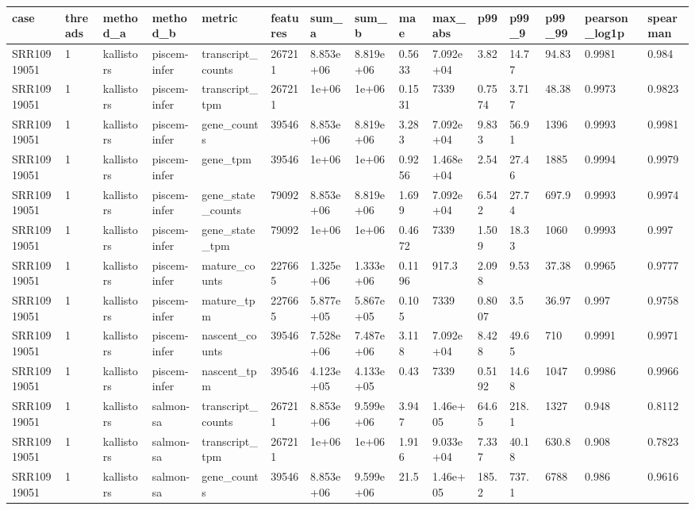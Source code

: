 \begin{tabular}{lllllllllllllll}
\toprule
case & threads & method\_a & method\_b & metric & features & sum\_a & sum\_b & mae & max\_abs & p99 & p99\_9 & p99\_99 & pearson\_log1p & spearman \\
\midrule
SRR10919051 & 1 & kallistors & piscem-infer & transcript\_counts & 267211 & 8.853e+06 & 8.819e+06 & 0.5633 & 7.092e+04 & 3.82 & 14.77 & 94.83 & 0.9981 & 0.984 \\
SRR10919051 & 1 & kallistors & piscem-infer & transcript\_tpm & 267211 & 1e+06 & 1e+06 & 0.1531 & 7339 & 0.7574 & 3.717 & 48.38 & 0.9973 & 0.9823 \\
SRR10919051 & 1 & kallistors & piscem-infer & gene\_counts & 39546 & 8.853e+06 & 8.819e+06 & 3.283 & 7.092e+04 & 9.833 & 56.91 & 1396 & 0.9993 & 0.9981 \\
SRR10919051 & 1 & kallistors & piscem-infer & gene\_tpm & 39546 & 1e+06 & 1e+06 & 0.9256 & 1.468e+04 & 2.54 & 27.46 & 1885 & 0.9994 & 0.9979 \\
SRR10919051 & 1 & kallistors & piscem-infer & gene\_state\_counts & 79092 & 8.853e+06 & 8.819e+06 & 1.699 & 7.092e+04 & 6.542 & 27.74 & 697.9 & 0.9993 & 0.9974 \\
SRR10919051 & 1 & kallistors & piscem-infer & gene\_state\_tpm & 79092 & 1e+06 & 1e+06 & 0.4672 & 7339 & 1.509 & 18.33 & 1060 & 0.9993 & 0.997 \\
SRR10919051 & 1 & kallistors & piscem-infer & mature\_counts & 227665 & 1.325e+06 & 1.333e+06 & 0.1196 & 917.3 & 2.098 & 9.53 & 37.38 & 0.9965 & 0.9777 \\
SRR10919051 & 1 & kallistors & piscem-infer & mature\_tpm & 227665 & 5.877e+05 & 5.867e+05 & 0.105 & 7339 & 0.8007 & 3.5 & 36.97 & 0.997 & 0.9758 \\
SRR10919051 & 1 & kallistors & piscem-infer & nascent\_counts & 39546 & 7.528e+06 & 7.487e+06 & 3.118 & 7.092e+04 & 8.428 & 49.65 & 710 & 0.9991 & 0.9971 \\
SRR10919051 & 1 & kallistors & piscem-infer & nascent\_tpm & 39546 & 4.123e+05 & 4.133e+05 & 0.43 & 7339 & 0.5192 & 14.68 & 1047 & 0.9986 & 0.9966 \\
SRR10919051 & 1 & kallistors & salmon-sa & transcript\_counts & 267211 & 8.853e+06 & 9.599e+06 & 3.947 & 1.46e+05 & 64.65 & 218.1 & 1327 & 0.948 & 0.8112 \\
SRR10919051 & 1 & kallistors & salmon-sa & transcript\_tpm & 267211 & 1e+06 & 1e+06 & 1.916 & 9.033e+04 & 7.337 & 40.18 & 630.8 & 0.908 & 0.7823 \\
SRR10919051 & 1 & kallistors & salmon-sa & gene\_counts & 39546 & 8.853e+06 & 9.599e+06 & 21.5 & 1.46e+05 & 185.2 & 737.1 & 6788 & 0.986 & 0.9616 \\

\end{tabular}
